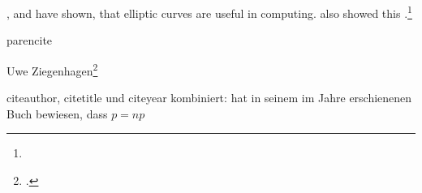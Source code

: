 \blindtext[12]

\blindtext \cite{Knuth1984}, \cite{Knuth1984}  and \cite{Buchin2023} have shown, that elliptic curves are useful in computing. \cite{Yu2021} also showed this   .\footnote{\blindtext}

\cite{Ziegenhagen2022}

parencite \parencite{Knuth1984}

Uwe Ziegenhagen\footcite{Ziegenhagen2022}

citeauthor, citetitle und citeyear kombiniert: \citeauthor{Knuth1984} hat in seinem im Jahre \citeyear{Knuth1984} erschienenen Buch  bewiesen, dass \(p = np \)

\printbibliography[title={Bücher},type=book] 

\printbibliography[title={Artikel},type=article] 

\printbibliography[title={Online-Quellen},type=www] 

